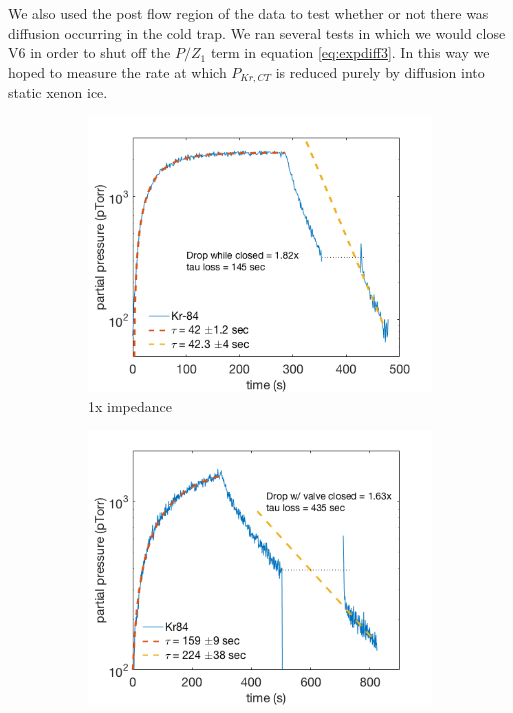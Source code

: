 \documentclass[12pt]{article}
\begin{document}
We also used the post flow region of the data to test whether or not there was diffusion occurring in the cold trap. We ran several tests in which we would close V6 in order to shut off the $P/Z_1$ term in equation \ref{eq:expdiff3}. In this way we hoped to measure the rate at which $P_{Kr,CT}$ is reduced purely by diffusion into static xenon ice. 
\begin{figure}[h!]
\centering
\begin{subfigure}{0.5\textwidth}
  \centering
  \includegraphics[width=\textwidth]{Figures/cyrano_pvt_1x.png}
  \caption{1x impedance}
  \label{fig:cyrano1x}
\end{subfigure}%
\begin{subfigure}{0.5\textwidth}
  \centering
  \includegraphics[width=\textwidth]{Figures/cyrano_pvt_15x.png}

\end{subfigure}
\end{figure}
\end{document}
